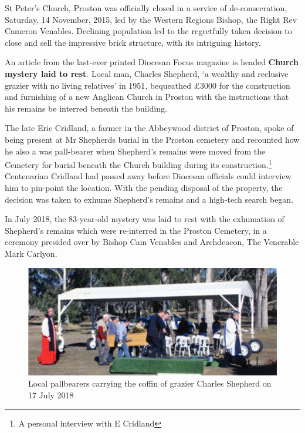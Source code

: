 St Peter's Church, Proston was officially closed in a service of de-consecration, Saturday, 14 November, 2015, led by the Western Regions Bishop, the Right Rev Cameron Venables. Declining population led to the regretfully taken decision to close and sell the impressive brick structure, with its intriguing history.



An article from the last-ever printed Diocesan Focus magazine is headed \textbf{Church mystery laid to rest}. Local man, Charles Shepherd, `a wealthy and reclusive grazier with no living relatives' in 1951, bequeathed \pounds3000 for the construction and furnishing of a new Anglican Church in Proston with the instructions that his remains be interred beneath the building.



The late Eric Cridland, a farmer in the Abbeywood district of Proston, spoke of being present at Mr Shepherds burial in the Proston cemetery and recounted how he also a was pall-bearer when Shepherd's remains were moved from the Cemetery for burial beneath the Church building during its construction.\footnote{A personal interview with E Cridland} Centenarian Cridland had passed away before Diocesan officials could interview him to pin-point the location. With the pending disposal of the property, the decision was taken to exhume Shepherd's remains and a high-tech search began.


In July 2018, the 83-year-old mystery was laid to rest with the exhumation of Shepherd's remains which were re-interred in the Proston Cemetery, in a ceremony presided over by Bishop Cam Venables and Archdeacon, The Venerable Mark Carlyon.









\begin{figure}[!htb]
\begin{center}
\includegraphics[width=1.\textwidth,center]{../images/charlesShepherd.jpg}
\caption{Local pallbearers carrying the coffin of grazier Charles Shepherd on 17 July 2018}
\end{center}
\end{figure}




